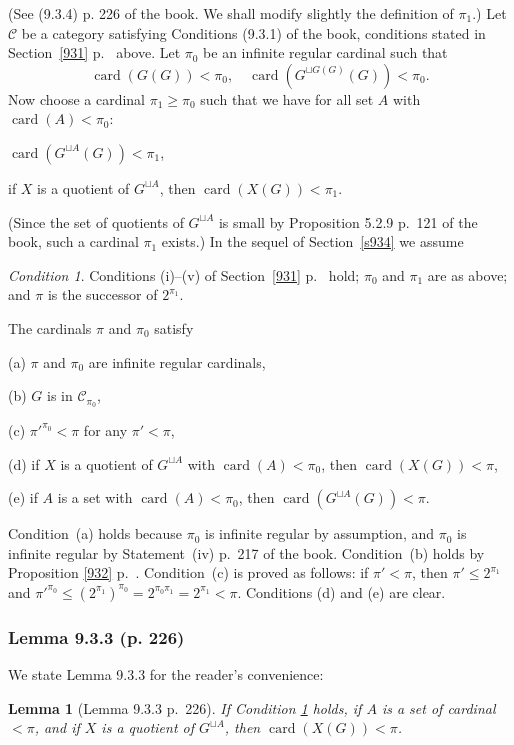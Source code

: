 \documentclass[12pt]{article}%
\newtheorem{lem}[thm]{Lemma}
\theoremstyle{remark}
\newtheorem{cond}[thm]{Condition}
\theoremstyle{definition}
\newcommand{\nn}{\noindent}
\newcommand{\C}{\mathcal C}
\DeclareMathOperator{\card}{card}%
\begin{document}
(See (9.3.4) p. 226 of the book. We shall modify slightly the definition of $\pi_1$.) Let $\C$ be a category satisfying Conditions (9.3.1) of the book, conditions stated in Section~\ref{931} p.~\pageref{931} above. Let $\pi_0$ be an infinite regular cardinal such that 
$$
\card(G(G))<\pi_0,\quad\card(G^{\sqcup G(G)}(G))<\pi_0.
$$ 
Now choose a cardinal $\pi_1\ge\pi_0$ such that we have for all set $A$ with $\card(A)<\pi_0$: 

$\card(G^{\sqcup A}(G))<\pi_1$, 

if $X$ is a quotient of $G^{\sqcup A}$, then $\card(X(G))<\pi_1$. 

\nn(Since the set of quotients of $G^{\sqcup A}$ is small by Proposition 5.2.9 p.~121 of the book, such a cardinal $\pi_1$ exists.) In the sequel of Section~\ref{s934} we assume 

\begin{cond}\label{ass}
Conditions (i)--(v) of Section~\ref{931} p.~\pageref{931} hold; $\pi_0$ and $\pi_1$ are as above; and $\pi$ is the successor of $2^{\pi_1}$.
\end{cond}

\nn The cardinals $\pi$ and $\pi_0$ satisfy 

(a) $\pi$ and $\pi_0$ are infinite regular cardinals,

(b) $G$ is in $\C_{\pi_0}$,

(c) $\pi'^{\pi_0}<\pi$ for any $\pi'<\pi$, 

(d) if $X$ is a quotient of $G^{\sqcup A}$ with $\card(A)<\pi_0$, then $\card(X(G))<\pi$, 

(e) if $A$ is a set with $\card(A)<\pi_0$, then $\card(G^{\sqcup A}(G))<\pi$.

\nn Condition~(a) holds because $\pi_0$ is infinite regular by assumption, and $\pi_0$ is infinite regular by Statement~(iv) p.~217 of the book. Condition~(b) holds by Proposition \ref{932} p.~\pageref{932}. Condition~(c) is proved as follows: if $\pi'<\pi$, then $\pi'\le2^{\pi_1}$ and $\pi'^{\pi_0}\le(2^{\pi_1})^{\pi_0}=2^{\pi_0\pi_1}=2^{\pi_1}<\pi$. Conditions (d) and (e) are clear. 

\subsubsection{Lemma 9.3.3 (p. 226)}

We state Lemma 9.3.3 for the reader's convenience:

\begin{lem}[Lemma 9.3.3 p.~226]\label{933}
If Condition \ref{ass} holds, if $A$ is a set of cardinal $<\pi$, and if $X$ is a quotient of $G^{\sqcup A}$, then $\card(X(G))<\pi$.
\end{lem}
\end{document}
